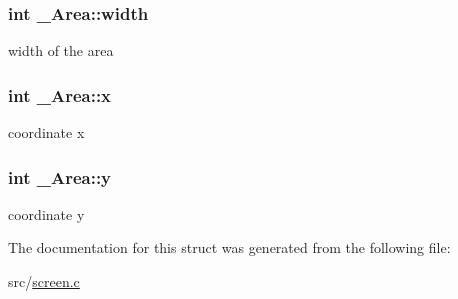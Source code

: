 \subsubsection[{\texorpdfstring{width}{width}}]{\setlength{\rightskip}{0pt plus 5cm}int \+\_\+\+Area\+::width}\hypertarget{struct__Area_aa2f753fc3d254821603ac4512db814f1}{}\label{struct__Area_aa2f753fc3d254821603ac4512db814f1}
width of the area 
\subsubsection[{\texorpdfstring{x}{x}}]{\setlength{\rightskip}{0pt plus 5cm}int \+\_\+\+Area\+::x}\hypertarget{struct__Area_a093b8c2929094bac88bbf5ee7db85573}{}\label{struct__Area_a093b8c2929094bac88bbf5ee7db85573}
coordinate x 
\subsubsection[{\texorpdfstring{y}{y}}]{\setlength{\rightskip}{0pt plus 5cm}int \+\_\+\+Area\+::y}\hypertarget{struct__Area_a867e601f05480db03237c3a17d4c77f8}{}\label{struct__Area_a867e601f05480db03237c3a17d4c77f8}
coordinate y 

The documentation for this struct was generated from the following file\+:\begin{DoxyCompactItemize}
\item 
src/\hyperlink{screen_8c}{screen.\+c}\end{DoxyCompactItemize}
